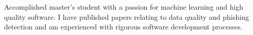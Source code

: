 

\begin{cvparagraph}

Accomplished master's student with a passion for machine learning and high quality software. I have published papers relating to data quality and phishing detection and am experienced with rigorous software development processes.
\end{cvparagraph}
